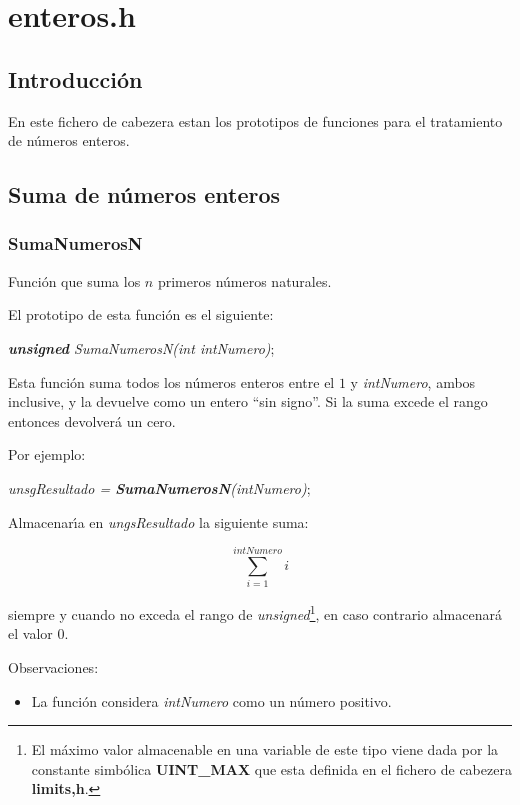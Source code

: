 %
%

\chapter{enteros.h}

\section{Introducci\'on}

En este fichero de cabezera estan los prototipos de funciones para el 
tratamiento de n\'umeros enteros.

\section{Suma de n\'umeros enteros}

\subsection{SumaNumerosN}

Funci\'on que suma los $n$ primeros n\'umeros naturales.\newline

El prototipo de esta funci\'on es el siguiente:

\begin{center}
\emph{\textbf{unsigned} SumaNumerosN(int intNumero)};
\end{center}

Esta funci\'on suma todos los n\'umeros enteros entre el $1$ y \emph{intNumero},
ambos inclusive, y la devuelve como un entero ``sin signo''. Si la suma excede
el rango entonces devolver\'a un cero.\newpage

Por ejemplo:

\begin{center}
\emph{unsgResultado = \textbf{SumaNumerosN}(intNumero)};
\end{center}

Almacenar\'{\i}a en \emph{ungsResultado} la siguiente suma:

\begin{displaymath}
\sum_{i=1}^{intNumero} i
\end{displaymath}

siempre y cuando no exceda el rango de \emph{unsigned}\footnote{El m\'aximo
valor almacenable en una variable de este tipo viene dada por la constante
simb\'olica \textbf{UINT\_MAX} que esta definida en el fichero de cabezera
\textbf{limits,h}.}, en caso contrario almacenar\'a el valor $0$.\newline

Observaciones:

\begin{itemize}
\item La funci\'on considera \emph{intNumero} como un n\'umero positivo.
\end{itemize}
